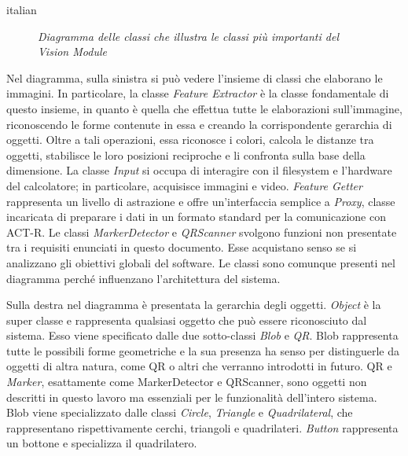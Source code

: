 \begin{otherlanguage*}{italian}
		\begin{figure}[h]
		  \begin{center} 
		  \end{center} 
		  \caption{\textit{Diagramma delle classi che illustra le classi più importanti del Vision Module}}  
		  \label{fig:classOverviewITA}
	 	\end{figure}	
		
		Nel diagramma, sulla sinistra si può vedere l'insieme di classi che elaborano le immagini.
		In particolare, la classe \emph{Feature Extractor} è la classe fondamentale di questo insieme, in quanto è quella che effettua tutte le elaborazioni sull'immagine, riconoscendo le forme contenute in essa e creando la corrispondente gerarchia di oggetti. 
		Oltre a tali operazioni, essa riconosce i colori, calcola le distanze tra oggetti, stabilisce le loro posizioni reciproche e li confronta sulla base della dimensione.
		La classe \emph{Input} si occupa di interagire con il filesystem e l'hardware del calcolatore; in particolare, acquisisce immagini e video.
		\emph{Feature Getter} rappresenta un livello di astrazione e offre un'interfaccia semplice a \emph{Proxy}, classe incaricata di preparare i dati in un formato standard per la comunicazione con \mbox{ACT-R}.
		Le classi \emph{MarkerDetector} e \emph{QRScanner} svolgono funzioni non presentate tra i requisiti enunciati in questo documento. Esse acquistano senso se si analizzano gli obiettivi globali del software.
		Le classi sono comunque presenti nel diagramma perché influenzano l'architettura del sistema.

		Sulla destra nel diagramma è presentata la gerarchia degli oggetti.
		\emph{Object} è la super classe e rappresenta qualsiasi oggetto che può essere riconosciuto dal sistema.
		Esso viene specificato dalle due sotto-classi \emph{Blob} e \emph{QR}.
		Blob rappresenta tutte le possibili forme geometriche e la sua presenza ha senso per distinguerle da oggetti di altra natura, come QR o altri che verranno introdotti in futuro.
		QR e \emph{Marker}, esattamente come MarkerDetector e QRScanner, sono oggetti non descritti in questo lavoro ma essenziali per le funzionalità dell'intero sistema.
		Blob viene specializzato dalle classi \emph{Circle}, \emph{Triangle} e \emph{Quadrilateral}, che rappresentano rispettivamente cerchi, triangoli e quadrilateri.
		\emph{Button} rappresenta un bottone e specializza il quadrilatero.




\end{otherlanguage*}
